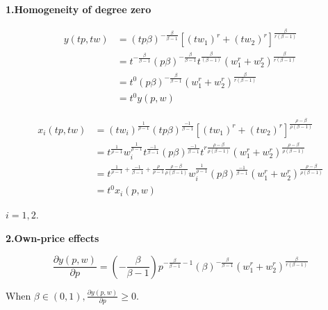 \documentclass{article}
\begin{document}
\vspace{3mm}
\textbf{1.Homogeneity of degree zero}

\begin{align*}
y(tp,tw) &= (tp\beta)^{-\frac{\beta}{\beta - 1}}[(tw_1)^r + (tw_2)^r]^{\frac{\beta}{r(\beta - 1)}} \\
 &= t^{-\frac{\beta}{\beta - 1}}(p\beta)^{-\frac{\beta}{\beta - 1}} t^{\frac{\beta}{(\beta - 1)}} (w_1^r + w_2^r)^{\frac{\beta}{r(\beta - 1)}} \\
 &=t^0(p\beta)^{-\frac{\beta}{\beta - 1}}(w_1^r + w_2^r)^{\frac{\beta}{r(\beta - 1)}} \\
  &=t^0 y(p,w) 
\end{align*}

\begin{align*}
x_i(tp,tw) &= (tw_i)^{\frac{1}{\rho -1}}  (tp\beta)^{\frac{-1}{\beta - 1}}[(tw_1)^r + (tw_2)^r]^{\frac{\rho -\beta}{\rho(\beta -1)}} \\
&= t^{\frac{1}{\rho -1}} w_i^{\frac{1}{\rho -1}} t^{\frac{-1}{\beta -1}} (p\beta)^{\frac{-1}{\beta - 1}} t^{r\frac{\rho -\beta}{\rho(\beta -1)}} (w_1^r + w_2^r)^{\frac{\rho -\beta}{\rho(\beta -1)}} \\
 &=t^{\frac{1}{\rho -1} + \frac{-1}{\beta -1} + \frac{\rho}{\rho - 1}\frac{\rho -\beta}{\rho(\beta -1)}} w_i^{\frac{1}{\rho -1}}  (p\beta)^{\frac{-1}{\beta - 1}}(w_1^r + w_2^r)^{\frac{\rho -\beta}{\rho(\beta -1)}} \\
  &=t^0 x_i(p,w)
\end{align*}

$i = 1,2$.

\vspace{3mm}
\textbf{2.Own-price effects}

$$\frac{\partial y(p,w)}{\partial p} =(-\frac{\beta}{\beta - 1})p^{-\frac{\beta}{\beta - 1} - 1} (\beta)^{-\frac{\beta}{\beta - 1}}(w_1^r + w_2^r)^{\frac{\beta}{r(\beta - 1)}}$$

When $\beta \in (0,1), \frac{\partial y(p,w)}{\partial p} \ge 0$.
\end{document}
